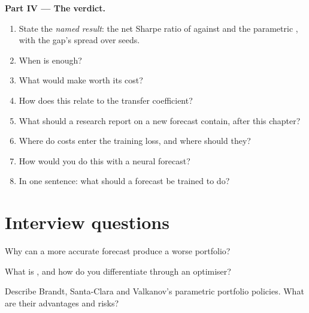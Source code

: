 \begin{problem}
\medskip\noindent\textbf{Part IV --- The verdict.}
\begin{enumerate}[resume]
\item State the \emph{named result}: the net Sharpe ratio of  against  and the
parametric , with the gap's spread over seeds.
\item When is  enough?
\item What would make  worth its cost?
\item How does this relate to the transfer coefficient?
\item What should a research report on a new forecast contain, after this chapter?
\item Where do costs enter the training loss, and where should they?
\item How would you do this with a neural forecast?
\item In one sentence: what should a forecast be trained to do?
\end{enumerate}
\end{problem}

\section{Interview questions}

\begin{interviewq}\label{iq:ml:from-prediction-to-portfolio:1}
Why can a more accurate forecast produce a worse portfolio?
\end{interviewq}

\begin{interviewq}\label{iq:ml:from-prediction-to-portfolio:2}
What is , and how do you differentiate through an optimiser?
\end{interviewq}

\begin{interviewq}\label{iq:ml:from-prediction-to-portfolio:3}
Describe Brandt, Santa-Clara and Valkanov's parametric portfolio policies. What are their advantages and risks?
\end{interviewq}

